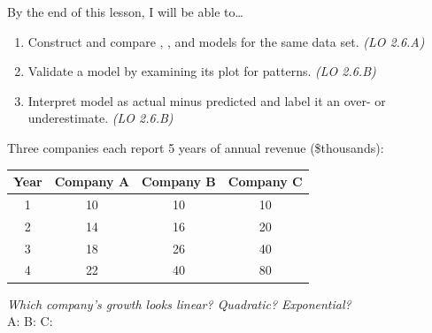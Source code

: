 \documentclass[10pt]{article}
\begin{document}
\namedateperiod

\vspace{0.06in}

\begin{objectivebox}
By the end of this lesson, I will be able to\ldots
\begin{enumerate}[itemsep=2pt]
  \item Construct and compare \blank{3cm}, \blank{3cm}, and \blank{3cm} models for the
        same data set. \hfill\textit{(LO 2.6.A)}
  \item Validate a model by examining its \blank{4cm} plot for patterns. \hfill\textit{(LO 2.6.B)}
  \item Interpret model \blank{3cm} as actual minus predicted and label it an over- or
        underestimate. \hfill\textit{(LO 2.6.B)}
\end{enumerate}
\end{objectivebox}

\vspace{0.05in}

\begin{vocabbox}
\end{vocabbox}

\vspace{0.05in}

\begin{hookbox}
Three companies each report 5 years of annual revenue (\$thousands):

\medskip
\begin{center}
\renewcommand{\arraystretch}{1.4}
\begin{tabular}{c|c|c|c}
\textbf{Year} & \textbf{Company A} & \textbf{Company B} & \textbf{Company C} \\ \hline
1 & 10 & 10 & 10 \\
2 & 14 & 16 & 20 \\
3 & 18 & 26 & 40 \\
4 & 22 & 40 & 80 \\
\end{tabular}
\end{center}

\medskip
\textit{Which company's growth looks linear? Quadratic? Exponential?} \\
A: \blank{4cm} \quad B: \blank{4cm} \quad C: \blank{4cm}
\end{hookbox}
\end{document}
